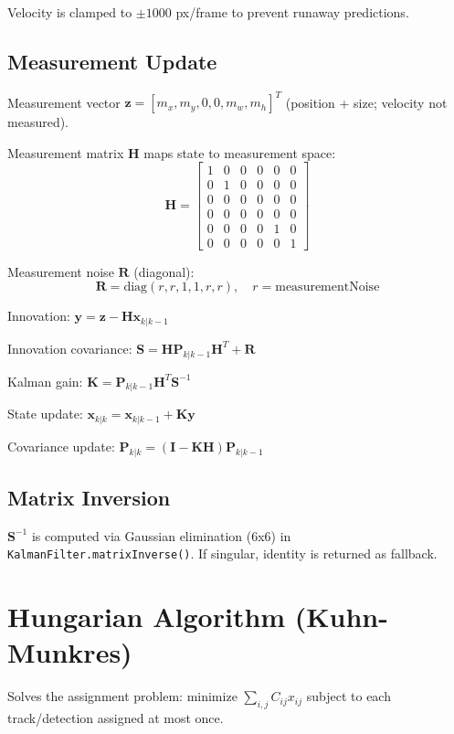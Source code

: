 Velocity is clamped to $\pm 1000$ px/frame to prevent runaway predictions.

\subsection{Measurement Update}
Measurement vector $\mathbf{z} = [m_x, m_y, 0, 0, m_w, m_h]^T$ (position + size; velocity not measured).

Measurement matrix $\mathbf{H}$ maps state to measurement space:
\[
\mathbf{H} = \begin{bmatrix}
1 & 0 & 0 & 0 & 0 & 0 \\
0 & 1 & 0 & 0 & 0 & 0 \\
0 & 0 & 0 & 0 & 0 & 0 \\
0 & 0 & 0 & 0 & 0 & 0 \\
0 & 0 & 0 & 0 & 1 & 0 \\
0 & 0 & 0 & 0 & 0 & 1
\end{bmatrix}
\]

Measurement noise $\mathbf{R}$ (diagonal):
\[
\mathbf{R} = \text{diag}(r, r, 1, 1, r, r), \quad r = \text{measurementNoise}
\]

Innovation: $\mathbf{y} = \mathbf{z} - \mathbf{H}\mathbf{x}_{k|k-1}$

Innovation covariance: $\mathbf{S} = \mathbf{H}\mathbf{P}_{k|k-1}\mathbf{H}^T + \mathbf{R}$

Kalman gain: $\mathbf{K} = \mathbf{P}_{k|k-1}\mathbf{H}^T \mathbf{S}^{-1}$

State update: $\mathbf{x}_{k|k} = \mathbf{x}_{k|k-1} + \mathbf{K}\mathbf{y}$

Covariance update: $\mathbf{P}_{k|k} = (\mathbf{I} - \mathbf{K}\mathbf{H})\mathbf{P}_{k|k-1}$

\subsection{Matrix Inversion}
$\mathbf{S}^{-1}$ is computed via Gaussian elimination (6x6) in \texttt{KalmanFilter.matrixInverse()}. If singular, identity is returned as fallback.

\section{Hungarian Algorithm (Kuhn-Munkres)}
\label{sec:hungarian-alg}

Solves the assignment problem: minimize $\sum_{i,j} C_{ij} x_{ij}$ subject to each track/detection assigned at most once.

